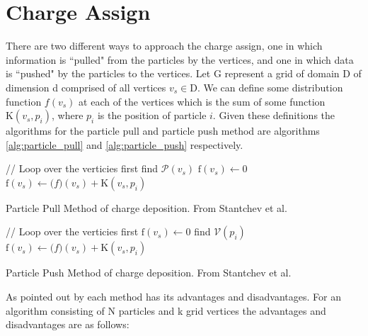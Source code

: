 	\section{Charge Assign}

There are two different ways to approach the charge assign, one in which information is ``pulled" from the particles by the vertices, and one in which data is ``pushed" by the particles to the vertices. Let G represent a grid of domain D of dimension d comprised of all vertices $v_s  \in \mathrm{D}$. We can define some distribution function $f(v_s)$ at each of the vertices which is the sum of some function $\mathrm{K}(v_s,p_i)$, where $p_i$ is the position of particle $i$. Given these definitions the algorithms for the particle pull and particle push method are algorithms \ref{alg:particle_pull} and \ref{alg:particle_push} respectively. 

\begin{algorithm}
	\begin{algorithmic}
		\STATE // Loop over the verticies first
			\STATE find $\mathcal{P}(v_s)$
			\STATE $\mathrm{f}(v_s) \leftarrow 0$
			\STATE $\mathrm{f}(v_s) \leftarrow \mathrm(f)(v_s) + \mathrm{K}(v_s,p_i)$
			\ENDFOR
		\ENDFOR
	\end{algorithmic}
	\caption{Particle Pull Method of charge deposition. From Stantchev et al. \cite{Stantchev2008}}
	\label{alg:particle_pull}
\end{algorithm}

\begin{algorithm}
	\begin{algorithmic}
		\STATE // Loop over the verticies first
		\FORALL{$\mathrm{vertex} \: v_s \in G$}
			\STATE $\mathrm{f}(v_s) \leftarrow 0$
		\ENDFOR
		\FORALL{$\mathrm{particle} \: p_i \in \mathrm{D}$}
			\STATE find $\mathcal{V}(p_i)$
			\FORALL{$v_s \in \mathcal{V}(p_i)$}
				\STATE $\mathrm{f}(v_s) \leftarrow \mathrm(f)(v_s) + \mathrm{K}(v_s,p_i)$
			\ENDFOR
		\ENDFOR
	\end{algorithmic}
	\caption{Particle Push Method of charge deposition. From Stantchev et al. \cite{Stantchev2008}}
	\label{alg:particle_push}
\end{algorithm}

As pointed out by \cite{Stantchev2008} each method has its advantages and disadvantages. For an algorithm consisting of N particles and k grid vertices the advantages and disadvantages are as follows:

